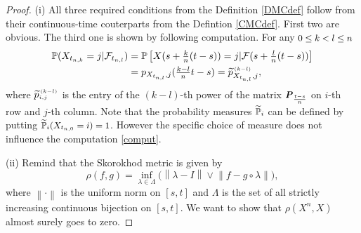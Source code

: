 \begin{proof}
(i) 
All three required conditions from the Definition \ref{DMCdef} follow from their continuous-time couterparts from the Defintion \ref{CMCdef}. First two are obvious. The third one is shown by following computation. For any $\mbox{\small{$0\leq k < l \leq n$}}$
\begin{equation}
\label{comput}
\begin{split}
\mathbb{P}(X_{t_{n,k}}=j|\mathcal{F}_{t_{n,l}})&=\mathbb{P}\left[X(s+\tfrac{k}{n}(t-s))=j|\mathcal{F}(s+\tfrac{l}{n}(t-s))\right]\\
&=p_{X_{t_{n,l}},j}(\tfrac{k-l}{n}t-s)  =\widetilde{p}_{X_{t_{n,l}},j}^{_{\,(k-l)}},
\end{split}
\end{equation}
where $\widetilde{p}_{^{i,j}}^{_{\,(k-l)}}$ is the entry of the \mbox{\small{$(k-l)$}}-th power of the matrix $\mbox{\small{$\mbox{\boldmath{$P$}}_{\frac{t-s}{n}}$}}$ on $i$-th row and $j$-th column.
Note that the probability measures $\mbox{\small{$\widetilde{\mathbb{P}}_{i}$}}$ can be defined by putting $\mbox{\small{$\widetilde{\mathbb{P}}_{i}(X_{t_{n,0}}=i)=1$}}$. However the specific choice of measure does not influence the computation \eqref{comput}.%

(ii) Remind that the Skorokhod metric is given by
\[ \rho(f,g)=\inf_{\lambda\in\Lambda}\Big( \left\|\lambda-I\right\| \vee \left\|f-g\circ\lambda\right\| \Big),\]
where $\left\|\cdot\right\|$ is the uniform norm on $[s,t]$ and $\Lambda$ is the set of all strictly increasing continuous bijection on $[s,t]$. We want to show that $\rho(X^n,X)$ almost surely goes to zero.


\end{proof}
